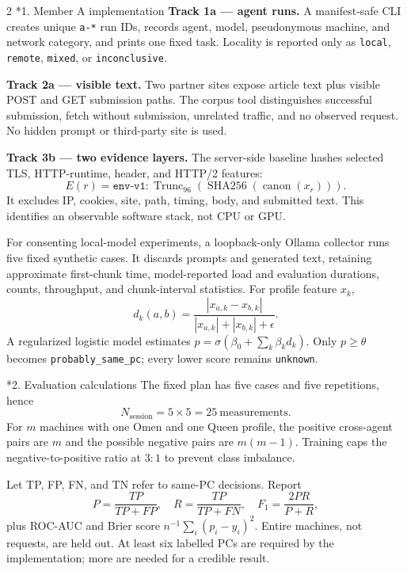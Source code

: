 \documentclass{article}
\makeatletter
\renewcommand\section{\@startsection{section}{1}{\z@}{0.8ex plus .2ex}{0.35ex}{\normalfont\normalsize\bfseries\color{navy}}}
\newcommand{\term}[1]{\texttt{#1}}
\makeatother
\begin{document}
\begin{multicols}{2}
\section*{1. Member A implementation}
\textbf{Track 1a --- agent runs.} A manifest-safe CLI creates unique \term{a-*} run IDs, records agent, model,
pseudonymous machine, and network category, and prints one fixed task. Locality is reported only as \term{local},
\term{remote}, \term{mixed}, or \term{inconclusive}.

\textbf{Track 2a --- visible text.} Two partner sites expose article text plus visible POST and GET submission
paths. The corpus tool distinguishes successful submission, fetch without submission, unrelated traffic, and no
observed request. No hidden prompt or third-party site is used.

\textbf{Track 3b --- two evidence layers.} The server-side baseline hashes selected TLS, HTTP-runtime, header, and
HTTP/2 features:
\[
E(r)=\texttt{env-v1}:\operatorname{Trunc}_{96}
\left(\operatorname{SHA256}(\operatorname{canon}(x_r))\right).
\]
It excludes IP, cookies, site, path, timing, body, and submitted text. This identifies an observable software stack,
not CPU or GPU.

For consenting local-model experiments, a loopback-only Ollama collector runs five fixed synthetic cases. It
discards prompts and generated text, retaining approximate first-chunk time, model-reported load and evaluation
durations, counts, throughput, and chunk-interval statistics. For profile feature $x_k$,
\[
d_k(a,b)=\frac{|x_{a,k}-x_{b,k}|}{|x_{a,k}|+|x_{b,k}|+\epsilon}.
\]
A regularized logistic model estimates $p=\sigma(\beta_0+\sum_k\beta_kd_k)$. Only $p\geq\theta$ becomes
\term{probably\_same\_pc}; every lower score remains \term{unknown}.

\section*{2. Evaluation calculations}
The fixed plan has five cases and five repetitions, hence
\[
N_{\mathrm{session}}=5\times5=25\ \text{measurements}.
\]
For $m$ machines with one Omen and one Queen profile, the positive cross-agent pairs are $m$ and the possible
negative pairs are $m(m-1)$. Training caps the negative-to-positive ratio at $3{:}1$ to prevent class imbalance.

Let TP, FP, FN, and TN refer to same-PC decisions. Report
\[
P=\frac{TP}{TP+FP},\quad R=\frac{TP}{TP+FN},\quad
F_1=\frac{2PR}{P+R},
\]
plus ROC-AUC and Brier score $n^{-1}\sum_i(p_i-y_i)^2$. Entire machines, not requests, are held out. At least six
labelled PCs are required by the implementation; more are needed for a credible result.


\end{multicols}
\end{document}
